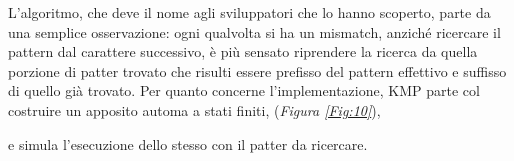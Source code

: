 \documentclass{subfiles}
\begin{document}
L'algoritmo, che deve il nome agli sviluppatori che lo hanno scoperto, parte da una semplice osservazione:
ogni qualvolta si ha un mismatch, anziché ricercare il pattern dal carattere successivo,
è più sensato riprendere la ricerca da quella porzione di patter trovato che risulti essere prefisso del pattern effettivo e suffisso di quello già trovato.
Per quanto concerne l'implementazione, KMP parte col costruire un apposito automa a stati finiti, (\emph{Figura \ref{Fig:10}}),

e simula l'esecuzione dello stesso con il patter da ricercare.
\end{document}
